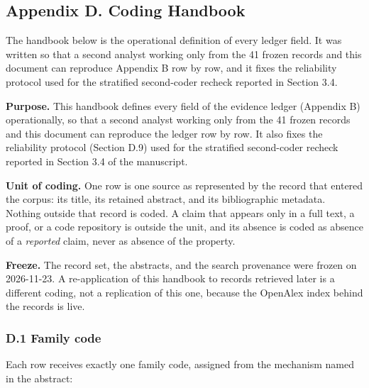 \documentclass[11pt]{article}
\begin{document}
\subsection*{Appendix D. Coding Handbook}
The handbook below is the operational definition of every ledger field. It was written so that a second analyst working only from the 41 frozen records and this document can reproduce Appendix B row by row, and it fixes the reliability protocol used for the stratified second-coder recheck reported in Section 3.4.

\textbf{Purpose.} This handbook defines every field of the evidence ledger (Appendix B) operationally, so that a second analyst working only from the 41 frozen records and this document can reproduce the ledger row by row. It also fixes the reliability protocol (Section D.9) used for the stratified second-coder recheck reported in Section 3.4 of the manuscript.

\textbf{Unit of coding.} One row is one source as represented by the record that entered the corpus: its title, its retained abstract, and its bibliographic metadata. Nothing outside that record is coded. A claim that appears only in a full text, a proof, or a code repository is outside the unit, and its absence is coded as absence of a \textit{reported} claim, never as absence of the property.

\textbf{Freeze.} The record set, the abstracts, and the search provenance were frozen on 2026-11-23. A re-application of this handbook to records retrieved later is a different coding, not a replication of this one, because the OpenAlex index behind the records is live.

\subsubsection*{D.1 Family code}
Each row receives exactly one family code, assigned from the mechanism named in the abstract:
\end{document}
